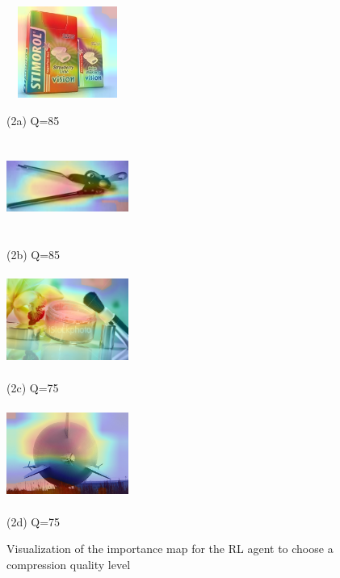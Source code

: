 \begin{figure}[htbp]
	\begin{minipage}{0.2\linewidth}
		\centerline{\includegraphics[width=4.0cm, height=3.0cm]{figures/sensetive_figure1.png}}
		\centerline{(2a) Q=85}
	\end{minipage}
	\hfill
	\begin{minipage}{0.2\linewidth}
		\centerline{\includegraphics[width=4.0cm, height=3.0cm]{figures/sensetive_figure2.png}}
		\centerline{(2b) Q=85}
	\end{minipage}
	\hfill
	\begin{minipage}{0.2\linewidth}
		\centerline{\includegraphics[width=4.0cm, height=3.0cm]{figures/sensetive_figure3.png}}
		\centerline{(2c) Q=75}
	\end{minipage}
	\hfill
	\begin{minipage}{0.2\linewidth}
		\centerline{\includegraphics[width=4.0cm, height=3.0cm]{figures/sensetive_figure4.png}}
		\centerline{(2d) Q=75}
	\end{minipage}
	\vspace{0.2cm}
	\caption{Visualization of the importance map for the RL agent to choose a compression quality level}
	\label{fig: attention}
\end{figure}

